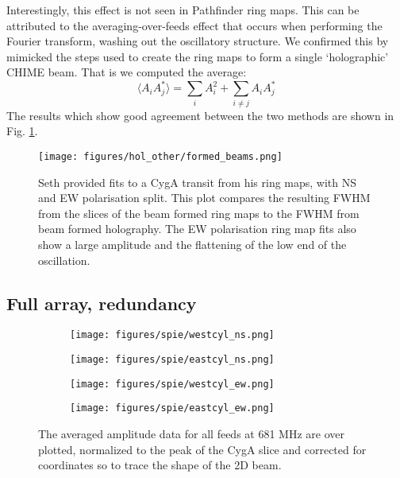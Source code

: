 Interestingly, this effect is not seen in Pathfinder ring maps. This can be attributed to the averaging-over-feeds effect that occurs when performing the Fourier transform, washing out the oscillatory structure. We confirmed this by mimicked the steps used to create the ring maps to form a single `holographic' CHIME beam. That is we computed the average:
\begin{equation}
\langle A_i A_j^* \rangle = \sum_i A_i^2 + \sum_{i \neq j} A_iA_j^*
\end{equation}
The results which show good agreement between the two methods are shown in Fig. \ref{formed_beams}.

\begin{figure}[h!]
\texttt{[image: figures/hol\_other/formed\_beams.png]}
\caption{Seth provided fits to a CygA transit from his ring maps, with NS and EW polarisation split. This plot compares the resulting FWHM from the slices of the beam formed ring maps to the FWHM from beam formed holography. The EW polarisation ring map fits also show a large amplitude and the flattening of the low end of the oscillation.}
\label{formed_beams}
\end{figure}

\subsection{Full array, redundancy} \label{ch:hol:sec:results:ss:fullarray}

\begin{figure}[h!] %
	\centering
	\begin{subfigure}[b]{0.49\textwidth}
		\texttt{[image: figures/spie/westcyl\_ns.png]}%
	\end{subfigure}
	\begin{subfigure}[b]{0.465\textwidth}
		\texttt{[image: figures/spie/eastcyl\_ns.png]}%
	\end{subfigure}
	\begin{subfigure}[b]{0.49\textwidth}
		\texttt{[image: figures/spie/westcyl\_ew.png]}%
	\end{subfigure}
	\begin{subfigure}[b]{0.46\textwidth}
		\texttt{[image: figures/spie/eastcyl\_ew.png]}%
	\end{subfigure}
\caption{The averaged amplitude data for all feeds at 681 MHz are over plotted, normalized to the peak of the CygA slice and corrected for coordinates so to trace the shape of the 2D beam. }
\label{allfeeds}
\end{figure}

